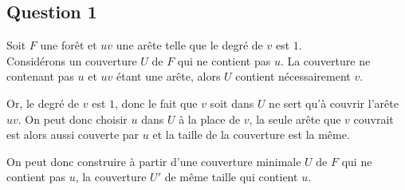   \subsection{Question 1}
  Soit $F$ une forêt et $uv$ une arête telle que le degré de $v$ est
  $1$.\\

  Considérons un couverture $U$ de $F$ qui ne contient pas $u$. La
  couverture ne contenant pas $u$ et $uv$ étant une arête, alors $U$
  contient nécessairement $v$.

  Or, le degré de $v$ est $1$, donc le fait que $v$ soit dans $U$ ne
  sert qu'à couvrir l'arête $uv$. On peut donc choisir $u$ dans $U$ à la
  place de $v$, la seule arête que $v$ couvrait est alors aussi couverte
  par $u$ et la taille de la couverture est la même.
  
  On peut donc construire à partir d'une couverture minimale $U$ de $F$
  qui ne contient pas $u$, la couverture $U'$ de même taille qui
  contient $u$.\\

  